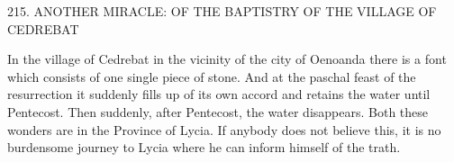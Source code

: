 215. ANOTHER MIRACLE: OF THE BAPTISTRY OF
THE VILLAGE OF CEDREBAT

In the village of Cedrebat in the vicinity of the city of Oenoanda
there is a font which consists of one single piece of stone. And at
the paschal feast of the resurrection it suddenly fills up of its own
accord and retains the water until Pentecost. Then suddenly, after
Pentecost, the water disappears. Both these wonders are in the
Province of Lycia. If anybody does not believe this, it is no
burdensome journey to Lycia where he can inform himself of the
trath.
